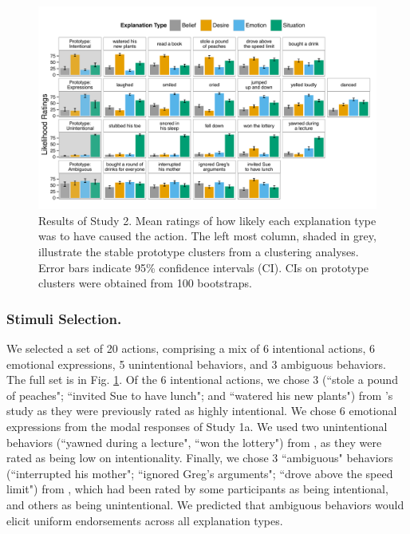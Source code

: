 \documentclass[10pt,letterpaper]{article}
\begin{document}
\begin{figure}[htb!]
\begin{center}
\includegraphics[width=1\linewidth]{images/study2Results.pdf}\end{center}
\caption{ Results of Study 2. Mean ratings of how likely each explanation type was to have caused the action. The left most column, shaded in grey, illustrate the stable prototype clusters from a clustering analyses. Error bars indicate 95\% confidence intervals (CI). CIs on prototype clusters were obtained from 100 bootstraps.}
\label{Study2ResultsFig}
\end{figure}


\subsubsection{Stimuli Selection.} We selected a set of 20 actions, comprising a mix of 6 intentional actions, 6 emotional expressions, 5 unintentional behaviors, and 3 ambiguous behaviors. The full set is in Fig. \ref{Study2ResultsFig}. Of the 6 intentional actions, we chose 3 (``stole a pound of peaches"; ``invited Sue to have lunch"; and ``watered his new plants") from 's study as they were previously rated as  highly intentional.%
We chose 6 emotional expressions from the modal responses of Study 1a. We used two unintentional behaviors (``yawned during a lecture", ``won the lottery") from , as they were rated as being low on intentionality.
Finally, we chose 3 ``ambiguous" behaviors (``interrupted his mother"; ``ignored Greg's arguments"; ``drove above the speed limit") from , which had been rated by some participants as being intentional, and others as being unintentional.
We predicted that ambiguous behaviors would elicit uniform endorsements across all explanation types.
\end{document}
